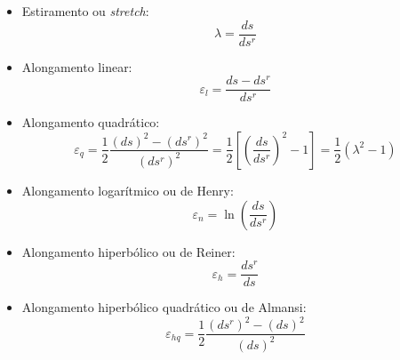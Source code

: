 \begin{itemize}
	\item Estiramento ou \textit{stretch}:
		\[\lambda=\frac{ds}{ds^r}\]
	\item Alongamento linear:
		\[\varepsilon_l=\frac{ds-ds^r}{ds^r}\]
	\item Alongamento quadrático:
		\[\varepsilon_q=\frac{1}{2}\frac{(ds)^2-(ds^r)^2}{(ds^r)^2}=\frac{1}{2}\left[\left(\frac{ds}{ds^r}\right)^2-1\right]=\frac{1}{2}(\lambda^2-1)\]
	\item Alongamento logarítmico ou de Henry:
		\[\varepsilon_n=\ln \left(\frac{ds}{ds^r}\right)\]
	\item Alongamento hiperbólico ou de Reiner:
		\[\varepsilon_h=\frac{ds^r}{ds}\]
	\item Alongamento hiperbólico quadrático ou de Almansi:
		\[\varepsilon_{hq}=\frac{1}{2}\frac{(ds^r)^2-(ds)^2}{(ds)^2}\]
\end{itemize}